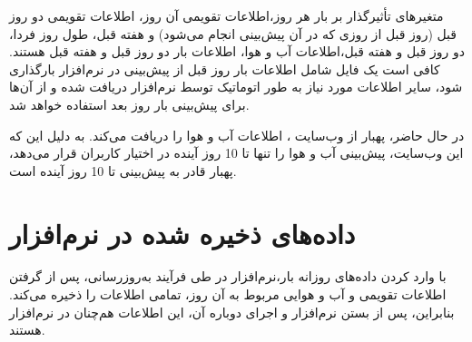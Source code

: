 \documentclass[a4paper,20pt,dvipsnames, usenames]{extbook}
\begin{document}
	متغیرهای تأثیرگذار بر بار هر روز،‌اطلاعات تقویمی آن روز، اطلاعات تقویمی دو روز قبل (روز قبل از روزی که در آن پیش‌بینی انجام می‌شود) و هفته قبل، طول روز فردا، دو روز قبل و هفته قبل،‌اطلاعات آب و هوا، اطلاعات بار دو روز قبل و هفته قبل هستند. کافی است یک فایل
	شامل اطلاعات بار روز قبل از پیش‌بینی در نرم‌افزار بارگذاری شود، سایر اطلاعات مورد نیاز به طور اتوماتیک توسط نرم‌افزار دریافت شده و از آن‌ها برای پیش‌بینی بار روز بعد استفاده خواهد شد.
	
	در حال حاضر،‌ پهبار از وب‌سایت ، اطلاعات آب و هوا را دریافت می‌کند. به دلیل این که این وب‌سایت، پیش‌بینی آب و هوا را تنها تا 10 روز آینده در اختیار کاربران قرار می‌دهد، پهبار قادر به پیش‌بینی تا 10 روز آینده است.
	
\chapter{داده‌های ذخیره شده در نرم‌افزار}
با وارد کردن داده‌های روزانه بار،‌نرم‌افزار در طی فرآیند به‌روزرسانی، پس از گرفتن اطلاعات تقویمی و آب و هوایی مربوط به آن روز،‌ تمامی اطلاعات را ذخیره می‌کند. بنابراین، پس از بستن نرم‌افزار و اجرای دوباره آن، این اطلاعات هم‌چنان در نرم‌افزار هستند. 
\end{document}
